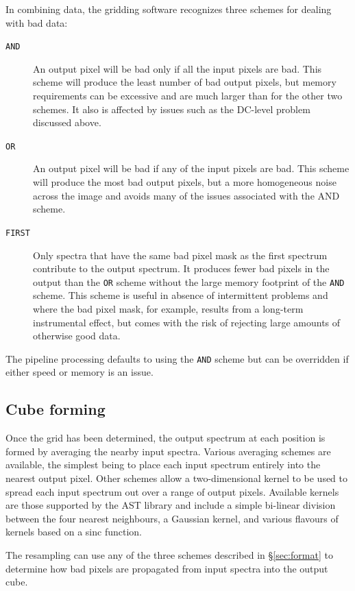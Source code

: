 \documentclass[useAMS,usenatbib]{mn2e}
\begin{document}
In combining data, the gridding software recognizes three schemes for
dealing with bad data:
\begin{description}
\item[\texttt{AND}] An output pixel will be bad only if all the input
   pixels are bad. This scheme will produce the least number of bad
   output pixels, but memory requirements can be excessive and are much
   larger than for the other two schemes. It also is affected by issues such
   as the DC-level problem discussed above.
\item[\texttt{OR}] An output pixel will be bad if any of the input
   pixels are bad. This scheme will produce the most bad output pixels,
   but a more homogeneous noise across the image and avoids many
   of the issues associated with the AND scheme.
\item[\texttt{FIRST}] Only spectra that have the same bad pixel mask
   as the first spectrum contribute to the output spectrum. It
   produces fewer bad pixels in the output than the \texttt{OR}
   scheme without the large memory footprint of the \texttt{AND} scheme.
   This scheme is useful in absence of intermittent problems and where
   the bad pixel mask, for example, results from a long-term instrumental effect, but
   comes with the risk of rejecting large amounts of otherwise good data.
\end{description}

The pipeline processing defaults to using the \texttt{AND} scheme but
can be overridden if either speed or memory is an issue.

\subsection{Cube forming}

Once the grid has been determined, the output spectrum at each
position is formed by averaging the nearby input spectra. Various
averaging schemes are available, the simplest being to place each
input spectrum entirely into the nearest output pixel. Other schemes
allow a two-dimensional kernel to be used to spread each input spectrum
out over a range of output pixels. Available kernels are those
supported by the AST library \citep{SUN211,2012ASPC..461..825B} and
include a simple bi-linear division between the four nearest
neighbours, a Gaussian kernel, and various flavours of kernels based
on a sinc function.

The resampling can use any of the three schemes described in
\S\ref{sec:format} to determine how bad pixels are propagated
from input spectra into the output cube.
\end{document}
